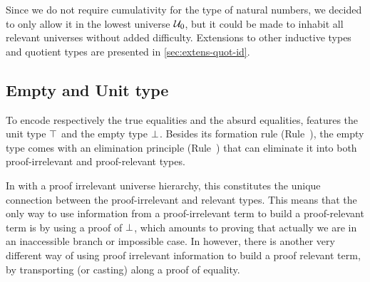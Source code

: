 
Since we do not require cumulativity for the type of natural numbers, we decided to only allow it
in the lowest universe \( \mathcal{U}_0 \), but it could be made to inhabit all relevant universes without
added difficulty.
%
Extensions to other inductive types and quotient types are presented
in \cref{sec:extens-quot-id}.

\subsection{Empty and Unit type}

To encode respectively the true equalities and the absurd equalities, \SetoidTT features the
unit type $\top$ and the empty type $\bot$.
%
Besides its formation rule (Rule~), the empty type comes
with an elimination principle (Rule~) that can eliminate it into
both proof-irrelevant and proof-relevant types.

%
In \MLTT with a proof irrelevant universe hierarchy, this constitutes the unique
connection between the proof-irrelevant and relevant types. This means
that the only way to use information from a proof-irrelevant term to
build a proof-relevant term is by using a proof of $\bot$, which
amounts to proving that actually we are in an inaccessible branch or
impossible case.
%
In \SetoidTT however, there is another very different way of using
proof irrelevant information to build a proof relevant term, by
transporting (or casting) along a proof of equality.

